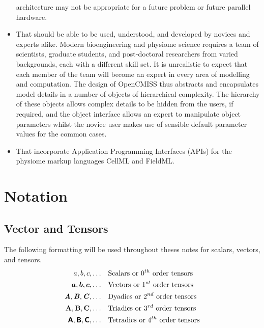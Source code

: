 \begin{itemize}
  architecture may not be appropriate for a future problem or future
  parallel hardware. 
\item That \OpenCMISS should be able to be used, understood, and
  developed by novices and experts alike. Modern bioengineering and
  physiome science requires a team of scientists, graduate students,
  and post-doctoral researchers from varied backgrounds, each with a
  different skill set. It is unrealistic to expect that each member of
  the team will become an expert in every area of modelling and
  computation. The design of OpenCMISS thus abstracts and encapsulates
  model details in a number of objects of hierarchical complexity. The
  hierarchy of these objects allows complex details to be hidden from
  the users, if required, and the object interface allows an expert to
  manipulate object parameters whilst the novice user makes use of
  sensible default parameter values for the common cases.
\item That \OpenCMISS incorporate Application Programming Interfaces
  (APIs) for the physiome markup languages CellML and FieldML.
\end{itemize}

\section{Notation} 
\label{sec:IntroNotation}
 
\subsection{Vector and Tensors}
\label{subsec:IntroVectorTensorNotation}

The following formatting will be used throughout theses notes for scalars, vectors, and tensors.
\begin{equation}
  \begin{split}
    a, b, c, \ldots & \quad\text{Scalars or $0^{th}$ order tensors} \\
     \boldsymbol{a} , \boldsymbol{b} , \boldsymbol{c} , \ldots & \quad\text{Vectors or $1^{st}$ order
      tensors} \\
    \boldsymbol{\mathit{A}},\boldsymbol{\mathit{B}},\boldsymbol{\mathit{C}}, \ldots & \quad\text{Dyadics or $2^{nd}$ order
      tensors} \\
    \boldsymbol{\mathrm{A}},\boldsymbol{\mathrm{B}},\boldsymbol{\mathrm{C}}, \ldots & \quad\text{Triadics or $3^{rd}$
      order tensors} \\
    \boldsymbol{\mathsf{A}},\boldsymbol{\mathsf{B}},\boldsymbol{\mathsf{C}}, \ldots & \quad\text{Tetradics or $4^{th}$
      order tensors}
  \end{split}
\end{equation}

